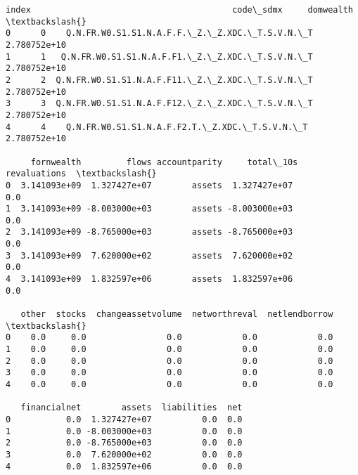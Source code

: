 \documentclass[11pt]{article}
\begin{document}
    \begin{Verbatim}[commandchars=\\\{\}]
   index                                        code\_sdmx     domwealth  \textbackslash{}
0      0    Q.N.FR.W0.S1.S1.N.A.F.F.\_Z.\_Z.XDC.\_T.S.V.N.\_T  2.780752e+10
1      1   Q.N.FR.W0.S1.S1.N.A.F.F1.\_Z.\_Z.XDC.\_T.S.V.N.\_T  2.780752e+10
2      2  Q.N.FR.W0.S1.S1.N.A.F.F11.\_Z.\_Z.XDC.\_T.S.V.N.\_T  2.780752e+10
3      3  Q.N.FR.W0.S1.S1.N.A.F.F12.\_Z.\_Z.XDC.\_T.S.V.N.\_T  2.780752e+10
4      4    Q.N.FR.W0.S1.S1.N.A.F.F2.T.\_Z.XDC.\_T.S.V.N.\_T  2.780752e+10

     fornwealth         flows accountparity     total\_10s  revaluations  \textbackslash{}
0  3.141093e+09  1.327427e+07        assets  1.327427e+07           0.0
1  3.141093e+09 -8.003000e+03        assets -8.003000e+03           0.0
2  3.141093e+09 -8.765000e+03        assets -8.765000e+03           0.0
3  3.141093e+09  7.620000e+02        assets  7.620000e+02           0.0
4  3.141093e+09  1.832597e+06        assets  1.832597e+06           0.0

   other  stocks  changeassetvolume  networthreval  netlendborrow  \textbackslash{}
0    0.0     0.0                0.0            0.0            0.0
1    0.0     0.0                0.0            0.0            0.0
2    0.0     0.0                0.0            0.0            0.0
3    0.0     0.0                0.0            0.0            0.0
4    0.0     0.0                0.0            0.0            0.0

   financialnet        assets  liabilities  net
0           0.0  1.327427e+07          0.0  0.0
1           0.0 -8.003000e+03          0.0  0.0
2           0.0 -8.765000e+03          0.0  0.0
3           0.0  7.620000e+02          0.0  0.0
4           0.0  1.832597e+06          0.0  0.0
    \end{Verbatim}
\end{document}
